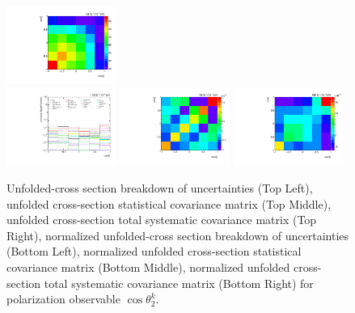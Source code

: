 \begin{refsection}
\begin{figure}[htb]
\begin{center}
 \includegraphics[width=0.32\textwidth]{fig_fullRun2UL/unfolding/combined/TotalSystCovMatrix_rebinnedB_b2k.pdf} \\
 \includegraphics[width=0.32\textwidth]{fig_fullRun2UL/unfolding/combined/deltaSystCombinedlogNorm_rebinnedB_b2k.pdf}
 \includegraphics[width=0.32\textwidth]{fig_fullRun2UL/unfolding/combined/StatCovMatrixNorm_rebinnedB_b2k.pdf}
 \includegraphics[width=0.32\textwidth]{fig_fullRun2UL/unfolding/combined/TotalSystCovMatrixNorm_rebinnedB_b2k.pdf} \\
\caption{Unfolded-cross section breakdown of uncertainties (Top Left), unfolded cross-section statistical covariance matrix (Top Middle), unfolded cross-section total systematic covariance matrix (Top Right), normalized unfolded-cross section breakdown of uncertainties (Bottom Left), normalized unfolded cross-section statistical covariance matrix (Bottom Middle), normalized unfolded cross-section total systematic covariance matrix (Bottom Right) for polarization observable $\cos\theta_{2}^{k}$.}
\label{fig:b2k_uncertainties}
\end{center}
\end{figure}
\clearpage
\begin{figure}[htb]
\begin{center}

\end{center}
\end{figure}
\end{refsection}
